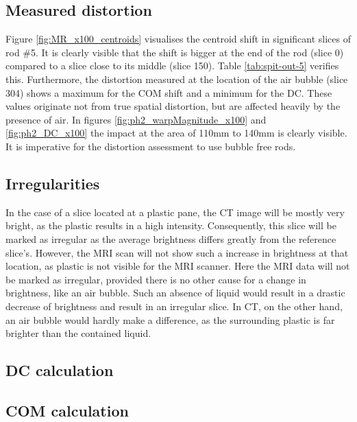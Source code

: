\subsection{Measured distortion}

Figure \ref{fig:MR_x100_centroids} visualises the centroid shift in significant slices of rod \#5.
It is clearly visible that the shift is bigger at the end of the rod (slice 0) compared to a slice close to its middle (slice 150).
Table \ref{tab:spit-out-5} verifies this.
Furthermore, the distortion measured at the location of the air bubble (slice 304) shows a maximum for the COM shift and a minimum for the DC.
These values originate not from true spatial distortion, but are affected heavily by the presence of air.
In figures \ref{fig:ph2_warpMagnitude_x100} and \ref{fig:ph2_DC_x100} the impact at the area of 110mm to 140mm is clearly visible.
It is imperative for the distortion assessment to use bubble free rods.

\subsection{Irregularities}
In the case of a slice located at a plastic pane, the CT image will be mostly very bright, as the plastic results in a high intensity.
Consequently, this slice will be marked as irregular as the average brightness differs greatly from the reference slice's.
However, the MRI scan will not show such a increase in brightness at that location, as plastic is not visible for the MRI scanner.
Here the MRI data will not be marked as irregular, provided there is no other cause for a change in brightness, like an air bubble.
Such an absence of liquid would result in a drastic decrease of brightness and result in an irregular slice.
In CT, on the other hand, an air bubble would hardly make a difference, as the surrounding plastic is far brighter than the contained liquid.

\subsection{DC calculation}
\label{sec:discussion_DC}

\subsection{COM calculation}




